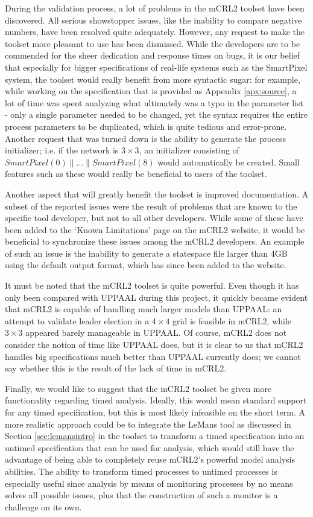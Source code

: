 During the validation process, a lot of problems in the mCRL2 toolset have been discovered. All serious showstopper issues, like the inability to compare negative numbers, have been resolved quite adequately. However, any request to make the toolset more pleasant to use has been dismissed. While the developers are to be commended for the sheer dedication and response times on bugs, it is our belief that especially for bigger specifications of real-life systems such as the SmartPixel system, the toolset would really benefit from more syntactic sugar: for example, while working on the specification that is provided as Appendix \ref{apx:source}, a lot of time was spent analyzing what ultimately was a typo in the parameter list - only a single parameter needed to be changed, yet the syntax requires the entire process parameters to be duplicated, which is quite tedious and error-prone. Another request that was turned down is the ability to generate the process initializer; i.e. if the network is $3 \times 3$, an initializer consisting of $SmartPixel(0) \parallel \dots \parallel SmartPixel(8)$ would automatically be created. Small features such as these would really be beneficial to users of the toolset.

Another aspect that will greatly benefit the toolset is improved documentation. A subset of the reported issues were the result of problems that are known to the specific tool developer, but not to all other developers. While some of these have been added to the `Known Limitations' page on the mCRL2 website, it would be beneficial to synchronize these issues among the mCRL2 developers. An example of such an issue is the inability to generate a statespace file larger than 4GB using the default output format, which has since been added to the website.

It must be noted that the mCRL2 toolset is quite powerful. Even though it has only been compared with UPPAAL during this project, it quickly became evident that mCRL2 is capable of handling much larger models than UPPAAL: an attempt to validate leader election in a $4 \times 4$ grid is feasible in mCRL2, while $3 \times 3$ appeared barely manageable in UPPAAL. Of course, mCRL2 does not consider the notion of time like UPPAAL does, but it is clear to us that mCRL2 handles big specifications much better than UPPAAL currently does; we cannot say whether this is the result of the lack of time in mCRL2.

Finally, we would like to suggest that the mCRL2 toolset be given more functionality regarding timed analysis. Ideally, this would mean standard support for any timed specification, but this is most likely infeasible on the short term. A more realistic approach could be to integrate the LeMans tool as discussed in Section \ref{sec:lemansintro} in the toolset to transform a timed specification into an untimed specification that can be used for analysis, which would still have the advantage of being able to completely reuse mCRL2's powerful model analysis abilities. The ability to transform timed processes to untimed processes is especially useful since analysis by means of monitoring processes by no means solves all possible issues, plus that the construction of such a monitor is a challenge on its own.
